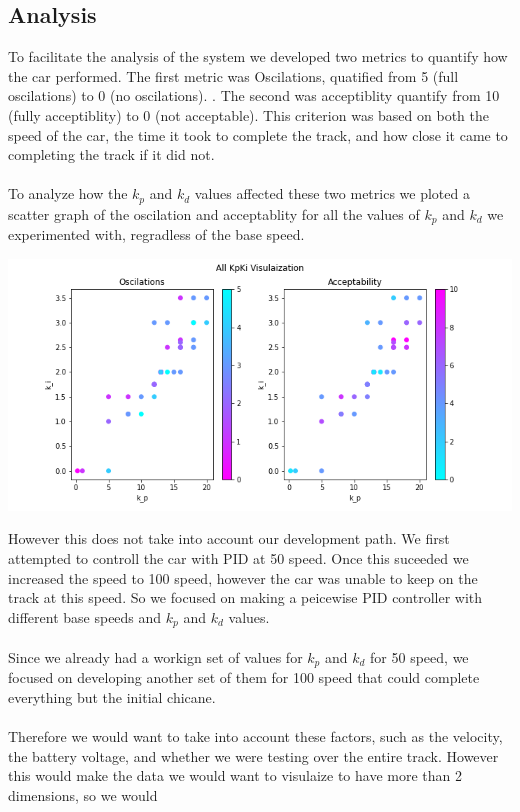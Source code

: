 \documentclass[12pt]{article}
\begin{document}
\begin{multicols}{2}
\section*{Analysis}
To facilitate the analysis of the system we developed two metrics to quantify how
the car performed. The first metric was Oscilations, quatified from 5 (full oscilations) to 0 (no oscilations).
. The second was acceptiblity quantify from 10 (fully acceptiblity) to 0 (not acceptable). This criterion was
based on both the speed of the car, the time it took to complete the track, and how close it came to 
completing the track if it did not. \\\\
To analyze how the $k_p$ and $k_d$ values affected these two metrics we ploted a scatter graph of the oscilation and acceptablity
for all the values of $k_p$ and $k_d$ we experimented with, regradless of the base speed.
\begin{center}
\includegraphics*[scale=0.3]{KpKiAll.png}
\end{center}
However this does not take into account our development path. 
We first attempted to controll the car with PID at 50 speed. Once this suceeded we increased the speed to 
100 speed, however the car was unable to keep on the track at this speed. So we focused on making a peicewise PID controller with different base speeds and 
$k_p$ and $k_d$ values.\\\\
 Since we already had a workign set of values for $k_p$ and $k_d$ for 50 speed, we focused on developing another set of
them for 100 speed that could complete everything but the initial chicane. \\\\
Therefore we would want to take into account these factors, such as the velocity, the battery voltage, and whether we were testing over the 
entire track. However this would make the data we would want to visulaize to have more than 2 dimensions, so we would

\end{multicols}
\end{document}
